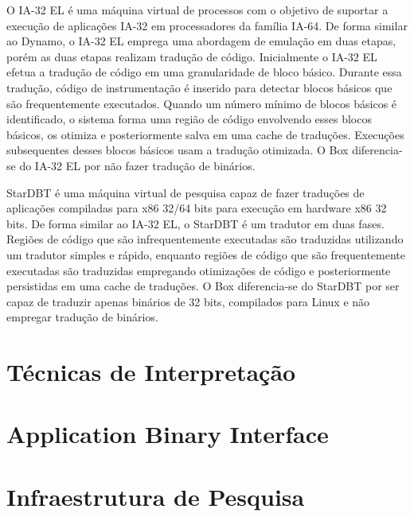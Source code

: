 \documentclass[11pt,twoside]{article}
\begin{document}
O IA-32 EL \cite{ia32el} é uma máquina virtual de processos com o objetivo de
suportar a execução de aplicações IA-32 em processadores da família IA-64.
De forma similar ao Dynamo, o IA-32 EL emprega uma abordagem de emulação em
duas etapas, porém as duas etapas realizam tradução de código. Inicialmente
o IA-32 EL efetua a tradução de código em uma granularidade de bloco básico.
Durante essa tradução, código de instrumentação é inserido para detectar blocos
básicos que são frequentemente executados. Quando um número mínimo de blocos básicos
é identificado, o sistema forma uma região de código envolvendo esses blocos
básicos, os otimiza e posteriormente salva em uma cache de traduções. Execuções
subsequentes desses blocos básicos usam a tradução otimizada. O Box diferencia-se 
do IA-32 EL por não fazer tradução de binários.

StarDBT \cite{stardbt} é uma máquina virtual de pesquisa capaz de fazer traduções de
aplicações compiladas para x86 32/64 bits para execução em hardware x86 32 bits.
De forma similar ao IA-32 EL, o StarDBT é um tradutor em duas fases. Regiões de
código que são infrequentemente executadas são traduzidas utilizando um tradutor
simples e rápido, enquanto regiões de código que são frequentemente executadas
são traduzidas empregando otimizações de código e posteriormente persistidas
em uma cache de traduções. O Box diferencia-se do StarDBT por ser capaz de traduzir
apenas binários de 32 bits, compilados para Linux e não empregar tradução
de binários.

\section{Técnicas de Interpretação}


\section{Application Binary Interface}


\section{Infraestrutura de Pesquisa}
%
\end{document}
